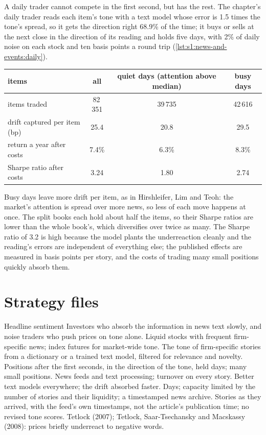 A daily trader cannot compete in the first second, but has the rest. The chapter's daily trader reads each item's tone with a text model whose error is
1.5 times the tone's spread, so it gets the direction right 68.9\% of the time; it buys or sells at the next close in the direction of its reading and
holds five days, with 2\% of daily noise on each stock and ten basis points a round trip (\cref{lst:s1:news-and-events:daily}).

\begin{center}
\small
\begin{tabular}{@{}lccc@{}}
\toprule
items & all & quiet days (attention above median) & busy days\\
\midrule
items traded & 82\,351 & 39\,735 & 42\,616\\
drift captured per item (bp) & 25.4 & 20.8 & 29.5\\
return a year after costs & 7.4\% & 6.3\% & 8.3\%\\
Sharpe ratio after costs & 3.24 & 1.80 & 2.74\\
\bottomrule
\end{tabular}
\end{center}

Busy days leave more drift per item, as in Hirshleifer, Lim and Teoh: the market's attention is spread over more news, so less of each move happens at
once. The split books each hold about half the items, so their Sharpe ratios are lower than the whole book's, which diversifies over twice as many. The
Sharpe ratio of 3.2 is high because the model plants the underreaction cleanly and the reading's errors are independent of everything else; the published
effects are measured in basis points per story, and the costs of trading many small positions quickly absorb them.

\section{Strategy files}

\begin{strategyfile}{Headline sentiment}\label{strat:s1:news-and-events:sentiment}
 Investors who absorb the information in news text slowly, and noise traders who push prices on tone alone.
 Liquid stocks with frequent firm-specific news; index futures for market-wide tone.
 The tone of firm-specific stories from a dictionary or a trained text model, filtered for relevance and novelty.
 Positions after the first seconds, in the direction of the tone, held days; many small positions.
 News feeds and text processing; turnover on every story.
 Better text models everywhere; the drift absorbed faster.
 Days; capacity limited by the number of stories and their liquidity; a timestamped news archive.
 Stories as they arrived, with the feed's own timestamps, not the article's publication time; no revised tone scores.
 Tetlock (2007); Tetlock, Saar-Tsechansky and Macskassy (2008): prices briefly underreact to negative words.
\end{strategyfile}

